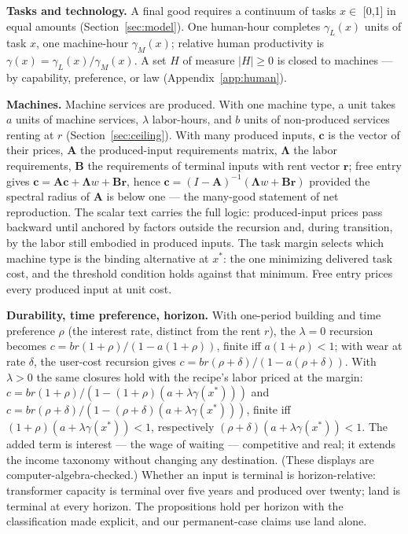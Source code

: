 \documentclass[12pt]{article}
\theoremstyle{plain}
\begin{document}
\textbf{Tasks and technology.} A final good requires a continuum of tasks $x \in$ [0,1] in equal amounts (Section~\ref{sec:model}). One human-hour completes $\gamma _L(x)$ units of task $x$, one machine-hour $\gamma _M(x)$; relative human productivity is $\gamma (x) = \gamma _L(x)/\gamma _M(x)$. A set $H$ of measure $|H| \ge 0$ is closed to machines --- by capability, preference, or law (Appendix~\ref{app:human}).

\textbf{Machines.} Machine services are produced. With one machine type, a unit takes $a$ units of machine services, $\lambda$ labor-hours, and $b$ units of non-produced services renting at $r$ (Section~\ref{sec:ceiling}). With many produced inputs, $\mathbf{c}$ is the vector of their prices, $\mathbf{A}$ the produced-input requirements matrix, $\boldsymbol{\Lambda}$ the labor requirements, $\mathbf{B}$ the requirements of terminal inputs with rent vector $\mathbf{r}$; free entry gives $\mathbf{c} = \mathbf{A}\mathbf{c} + \boldsymbol{\Lambda}w + \mathbf{B}\mathbf{r}$, hence $\mathbf{c} = (I-\mathbf{A})^{-1}(\boldsymbol{\Lambda}w + \mathbf{B}\mathbf{r})$ provided the spectral radius of $\mathbf{A}$ is below one --- the many-good statement of net reproduction. The scalar text carries the full logic: produced-input prices pass backward until anchored by factors outside the recursion and, during transition, by the labor still embodied in produced inputs. The task margin selects which machine type is the binding alternative at $x^*$: the one minimizing delivered task cost, and the threshold condition holds against that minimum. Free entry prices every produced input at unit cost.

\textbf{Durability, time preference, horizon.} With one-period building and time preference $\rho$ (the interest rate, distinct from the rent $r$), the $\lambda = 0$ recursion becomes $c = br(1+\rho )/(1 - a(1+\rho ))$, finite iff $a(1+\rho ) < 1$; with wear at rate $\delta$, the user-cost recursion gives $c = br(\rho +\delta )/(1 - a(\rho +\delta ))$. With $\lambda > 0$ the same closures hold with the recipe's labor priced at the margin: $c = br(1+\rho )/(1 - (1+\rho )(a + \lambda \gamma (x^*)))$ and $c = br(\rho +\delta )/(1 - (\rho +\delta )(a + \lambda \gamma (x^*)))$, finite iff $(1+\rho )(a + \lambda \gamma (x^*)) < 1$, respectively $(\rho +\delta )(a + \lambda \gamma (x^*)) < 1$. The added term is interest --- the wage of waiting --- competitive and real; it extends the income taxonomy without changing any destination. (These displays are computer-algebra-checked.) Whether an input is terminal is horizon-relative: transformer capacity is terminal over five years and produced over twenty; land is terminal at every horizon. The propositions hold per horizon with the classification made explicit, and our permanent-case claims use land alone.
\end{document}
